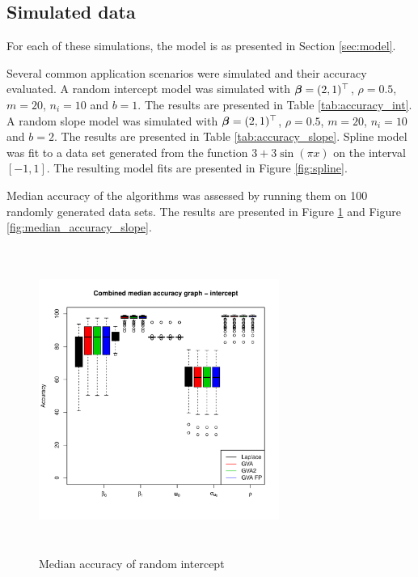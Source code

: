 \documentclass{amsart}[12pt]
\begin{document}
	\subsection{Simulated data}
		
	For each of these simulations, the model is as presented in Section \ref{sec:model}.
		
	Several common application scenarios were simulated and their accuracy evaluated. A random intercept model was simulated with ${\boldsymbol \beta} = (2, 1)^\top$, $\rho = 0.5$, $m = 20$, $n_i = 10$ and $b = 1$. The results are
	presented in Table \ref{tab:accuracy_int}. A random slope model was simulated with ${\boldsymbol \beta} = (2, 1)^\top$,
	$\rho = 0.5$, $m = 20$, $n_i = 10$ and $b = 2$. The results are presented in Table \ref{tab:accuracy_slope}.
	Spline model was fit to a data set generated from the function $3 + 3 \sin{(\pi x)}$ on the interval $[-1,
	1]$. The resulting model fits are presented in Figure \ref{fig:spline}.
		
		
	Median accuracy of the algorithms was assessed by running them on 100 randomly generated data sets. The	results are presented in Figure \ref{fig:median_accuracy_intercept} and Figure
	\ref{fig:median_accuracy_slope}.
		
	\begin{figure}
		\begin{center}
			\includegraphics[width=0.7\textwidth, height=100mm]{code/results/median_accuracy_combined_intercept.pdf}
			\caption{Median accuracy of random intercept}
			\label{fig:median_accuracy_intercept}
		\end{center}
	\end{figure}
		
\end{document}
